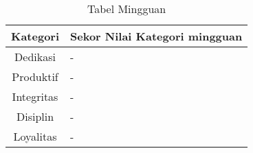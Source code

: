 \begin{table}[h]
\begin{center}
\caption{Tabel Mingguan}
\begin{tabular}{|c|l|}
\hline
Kategori& Sekor Nilai Kategori mingguan\\
\hline
Dedikasi & -\\
\hline
Produktif & -\\
\hline
Integritas & -\\
\hline
Disiplin & -\\
\hline
Loyalitas & -\\
\hline
\end{tabular}
\end{center}
\label {Tabel:contoh} 
\end{table}